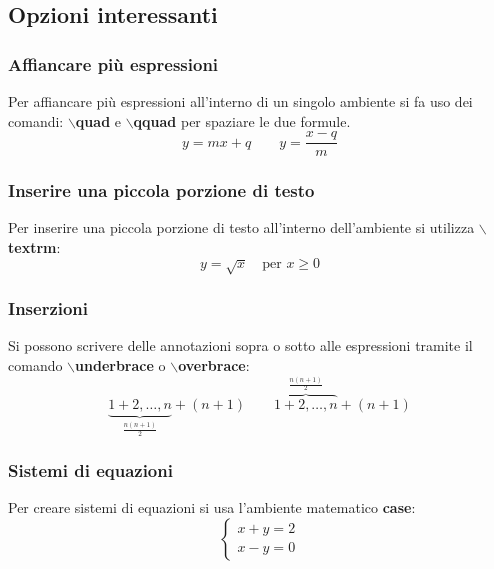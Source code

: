\documentclass[a4paper, 12pt]{book}
\theoremstyle{plain}
\begin{document}
	\subsection{Opzioni interessanti}
	\subsubsection{Affiancare più espressioni}
	Per affiancare più espressioni all'interno di un singolo ambiente si fa uso dei comandi: \textbf{$\backslash$quad} e \textbf{$\backslash$qquad} per spaziare le due formule.
	\[
	y = mx + q\qquad y = \frac{x - q}{m}
	\]
	\subsubsection{Inserire una piccola porzione di testo}
	Per inserire una piccola porzione di testo all'interno dell'ambiente si utilizza \textbf{$\backslash$textrm}:
	\[
	y = \sqrt{x} \quad\textrm{per $x\geq 0$}
	\]
	
	\subsubsection{Inserzioni}
	Si possono scrivere delle annotazioni sopra o sotto alle espressioni tramite il comando \textbf{$\backslash$underbrace} o \textbf{$\backslash$overbrace}:
	\[
	\underbrace{1 + 2, \dots, n}_{\frac{n(n + 1)}{2}} + (n + 1)\qquad \overbrace{1 + 2, \dots, n}^{\frac{n(n + 1)}{2}} + (n + 1)
	\]
	
	\subsubsection{Sistemi di equazioni}
	Per creare sistemi di equazioni si usa l'ambiente matematico \textbf{case}:
	\[
	\begin{cases}
		x + y = 2\\
		x - y = 0
	\end{cases}
	\]
	
\end{document}

